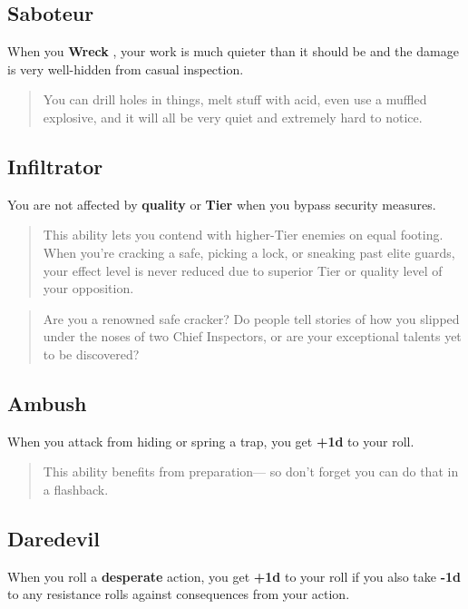 \documentclass[11pt,fleqn,a5paper]{book}
\newcommand{\gameterm}[1]{\textbf{#1}}
\begin{document}
\subsection{Saboteur}

When you \gameterm{Wreck} , your work is much quieter than it should be and the damage is very well-hidden from casual inspection.

\begin{quote}
	You can drill holes in things, melt stuff with acid, even use a muffled explosive, and it will all be very quiet and extremely hard to notice.
\end{quote} 

\subsection{Infiltrator}

You are not affected by \textbf{quality} or \textbf{Tier} when you bypass security measures.

\begin{quote}
	This ability lets you contend with higher-Tier enemies on equal footing. When you’re cracking a safe, picking a lock, or sneaking past elite guards, your effect level is never reduced due to superior Tier or quality level of your opposition.
\end{quote} 

\begin{quote}
	Are you a renowned safe cracker? Do people tell stories of how you slipped under the noses of two Chief Inspectors, or are your exceptional talents yet to be discovered?
\end{quote} 

\subsection{Ambush}

When you attack from hiding or spring a trap, you get \textbf{+1d} to your roll.

\begin{quote}
	This ability benefits from preparation--- so don’t forget you can do that in a flashback.
\end{quote} 

\subsection{Daredevil}

When you roll a \textbf{desperate} action, you get \textbf{+1d} to your roll if you also take \textbf{-1d} to any resistance rolls against consequences from your action.
\end{document}
